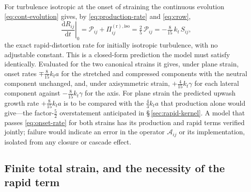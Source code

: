 \documentclass[lineno]{JFM-FLM_Au}
\begin{document}
For turbulence isotropic at the onset of straining the continuous
evolution \eqref{eq:cont-evolution} gives, by
\eqref{eq:production-rate} and \eqref{eq:crow},
\begin{equation}
  \left.\frac{\mathrm{d}R_{ij}}{\mathrm{d}t}\right|_{0}
  = \mathcal{P}_{ij}+\Pi^{(\mathrm r),\mathrm{iso}}_{ij}
  = \tfrac{2}{5}\,\mathcal{P}_{ij}
  = -\tfrac{8}{15}\,k_t\,S_{ij},
  \label{eq:onset-rate}
\end{equation}
the exact rapid-distortion rate for initially isotropic turbulence, with
no adjustable constant. This is a closed-form prediction the model must satisfy identically. Evaluated for the two canonical strains it gives, under
plane strain, onset rates $\mp\tfrac{8}{15}k_ta$ for the stretched and
compressed components with the neutral component unchanged, and, under
axisymmetric strain, $+\tfrac{4}{15}k_t\gamma$ for each lateral
component against $-\tfrac{8}{15}k_t\gamma$ for the axis. For plane
strain the predicted upwash growth rate $+\tfrac{8}{15}k_ta$ is to be
compared with the $\tfrac43k_ta$ that production alone would give---the
factor-$\tfrac52$ overstatement anticipated in
\S\,\ref{sec:rapid-kernel}. A model that passes \eqref{eq:onset-rate}
for both strains has its production and rapid terms verified jointly;
failure would indicate an error in the operator $\mathcal{A}_{ij}$ or
its implementation, isolated from any closure or cascade effect.

\subsection{Finite total strain, and the necessity of the rapid term}
\label{sec:finite-strain}
\end{document}
